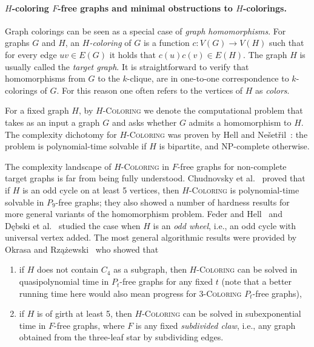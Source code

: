 \documentclass[11pt,a4paper]{article}
\theoremstyle{mystyle}
\newcommand{\colo}[1]{\ensuremath{#1}-\textsc{Coloring}\xspace}
\newcommand{\NP}{\textsf{NP}}
\begin{document}
\paragraph{$H$-coloring $F$-free graphs and minimal obstructions to $H$-colorings.} Graph colorings can be seen as a special case of \emph{graph homomorphisms}.
For graphs $G$ and $H$, an \emph{$H$-coloring} of $G$ is a function $c: V(G) \to V(H)$ such that for every edge $uv \in E(G)$ it holds that $c(u)c(v) \in E(H)$. The graph $H$ is usually called the \emph{target graph}.
It is straightforward to verify that homomorphisms from $G$ to the $k$-clique, are in one-to-one correspondence to $k$-colorings of $G$. For this reason one often refers to the vertices of $H$ as \emph{colors}.

For a fixed graph $H$, by \colo{H} we denote the computational problem that takes as an input a graph $G$ and asks whether $G$ admits a homomorphism to $H$. The complexity dichotomy for \colo{H} was proven by Hell and Ne\v{s}et\v{r}il~\cite{DBLP:journals/jct/HellN90}: the problem is polynomial-time solvable if $H$ is bipartite, and \NP-complete otherwise.

The complexity landscape of \colo{H} in $F$-free graphs for non-complete target graphs is far from being fully understood.
Chudnovsky et al.~\cite{DBLP:journals/iandc/ChudnovskyHRSZ23} proved that if $H$ is an odd cycle on at least 5 vertices, then \colo{H} is polynomial-time solvable in $P_9$-free graphs; they also showed a number of hardness results for more general variants of the homomorphism problem.
Feder and Hell~\cite{edgelists} and Dębski et al.~\cite{debski_et_al:LIPIcs.ISAAC.2022.14} studied the case when $H$ is an \emph{odd wheel}, i.e., an odd cycle with universal vertex added.
The most general algorithmic results were provided by Okrasa and Rzążewski~\cite{DBLP:conf/stacs/OkrasaR21} who showed that 
\begin{enumerate}[(OR1)]
    \item if $H$ does not contain $C_4$ as a subgraph, then \colo{H} can be solved in quasipolynomial time in $P_t$-free graphs for any fixed $t$ (note that a better running time here would also mean progress for  \colo{3} $P_t$-free graphs),
    \item if $H$ is of girth at least 5, then \colo{H} can be solved in subexponential time in $F$-free graphs, where $F$ is any fixed \emph{subdivided claw}, i.e., any graph obtained from the three-leaf star by subdividing edges.
\end{enumerate}
\end{document}
